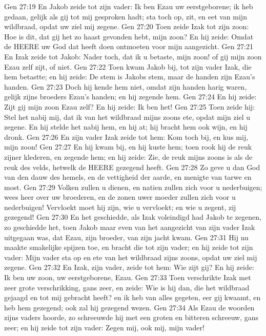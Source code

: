Gen 27:19  En Jakob zeide tot zijn vader: Ik ben Ezau uw eerstgeborene; ik heb gedaan, gelijk als gij tot mij gesproken hadt; sta toch op, zit, en eet van mijn wildbraad, opdat uw ziel mij zegene.
Gen 27:20  Toen zeide Izak tot zijn zoon: Hoe is dit, dat gij het zo haast gevonden hebt, mijn zoon? En hij zeide: Omdat de HEERE uw God dat heeft doen ontmoeten voor mijn aangezicht.
Gen 27:21  En Izak zeide tot Jakob: Nader toch, dat ik u betaste, mijn zoon! of gij mijn zoon Ezau zelf zijt, of niet.
Gen 27:22  Toen kwam Jakob bij, tot zijn vader Izak, die hem betastte; en hij zeide: De stem is Jakobs stem, maar de handen zijn Ezau's handen.
Gen 27:23  Doch hij kende hem niet, omdat zijn handen harig waren, gelijk zijns broeders Ezau's handen; en hij zegende hem.
Gen 27:24  En hij zeide: Zijt gij mijn zoon Ezau zelf? En hij zeide: Ik ben het!
Gen 27:25  Toen zeide hij: Stel het nabij mij, dat ik van het wildbraad mijns zoons ete, opdat mijn ziel u zegene. En hij stelde het nabij hem, en hij at; hij bracht hem ook wijn, en hij dronk.
Gen 27:26  En zijn vader Izak zeide tot hem: Kom toch bij, en kus mij, mijn zoon!
Gen 27:27  En hij kwam bij, en hij kuste hem; toen rook hij de reuk zijner klederen, en zegende hem; en hij zeide: Zie, de reuk mijns zoons is als de reuk des velds, hetwelk de HEERE gezegend heeft.
Gen 27:28  Zo geve u dan God van den dauw des hemels, en de vettigheid der aarde, en menigte van tarwe en most.
Gen 27:29  Volken zullen u dienen, en natien zullen zich voor u nederbuigen; wees heer over uw broederen, en de zonen uwer moeder zullen zich voor u nederbuigen! Vervloekt moet hij zijn, wie u vervloekt; en wie u zegent, zij gezegend!
Gen 27:30  En het geschiedde, als Izak voleindigd had Jakob te zegenen, zo geschiedde het, toen Jakob maar even van het aangezicht van zijn vader Izak uitgegaan was, dat Ezau, zijn broeder, van zijn jacht kwam.
Gen 27:31  Hij nu maakte smakelijke spijzen toe, en bracht die tot zijn vader; en hij zeide tot zijn vader: Mijn vader sta op en ete van het wildbraad zijns zoons, opdat uw ziel mij zegene.
Gen 27:32  En Izak, zijn vader, zeide tot hem: Wie zijt gij? En hij zeide: Ik ben uw zoon, uw eerstgeborene, Ezau.
Gen 27:33  Toen verschrikte Izak met zeer grote verschrikking, gans zeer, en zeide: Wie is hij dan, die het wildbraad gejaagd en tot mij gebracht heeft? en ik heb van alles gegeten, eer gij kwaamt, en heb hem gezegend; ook zal hij gezegend wezen.
Gen 27:34  Als Ezau de woorden zijns vaders hoorde, zo schreeuwde hij met een groten en bitteren schreeuw, gans zeer; en hij zeide tot zijn vader: Zegen mij, ook mij, mijn vader!
